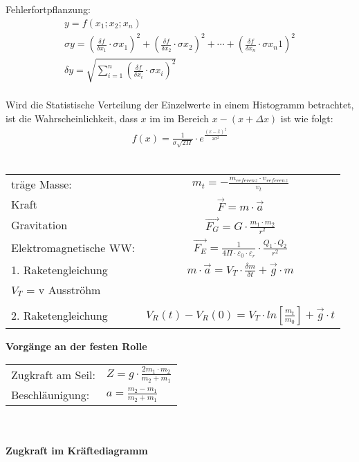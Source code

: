 \documentclass[a4paper,12pt]{scrartcl}
\begin{document}
Fehlerfortpflanzung:
\Large
\begin{multline*}
y = f(x_1;x_2;x_n) \\
\sigma y = (\frac{\delta f}{\delta x_1} \cdot \sigma x_1)^2 + (\frac{\delta f}{\delta x_2} \cdot \sigma x_2)^2 + \dotsb + (\frac{\delta f}{\delta x_n} \cdot \sigma x_n1)^2 \\
\delta y = \sqrt{\sum\limits_{i=1}^n (\frac{\delta f}{\delta x_i} \cdot \sigma x_i)^2}
\end{multline*}
\\
Wird die Statistische Verteilung der Einzelwerte in einem Histogramm betrachtet, ist die Wahrscheinlichkeit, dass $x$ im im Bereich $x-(x+ \Delta x)$ ist wie folgt: \\
\Large
\begin{align*}
 f(x) = \frac{1}{\sigma \sqrt{2 \Pi}} \cdot e^{\frac{(x-\bar{x})^2}{2 \sigma ^2}}
\end{align*}  
\\
\begin{tabular}{lc}


träge Masse: & \Large $m_t = - \frac{m_{referenz} \cdot v_{referenz}}{v_t}$\\


Kraft & $\overrightarrow{F} = m \cdot \overrightarrow{a}$\\
Gravitation & $\overrightarrow{F_G} = G \cdot \frac{m_1 \cdot m_2 }{r^2}$\\
Elektromagnetische WW: & $\overrightarrow{F_E} = \frac{1}{4 \Pi \cdot \varepsilon_0 \cdot \varepsilon_r} \cdot \frac{Q_1 \cdot Q_2}{r^2}$\\

1. Raketengleichung & $m \cdot \overrightarrow{a} = V_T \cdot \frac{\delta m}{\delta t} + \overrightarrow{g} \cdot m$\\
$V_T$ = v Ausströhm\\ & 
\\
2. Raketengleichung & $V_R(t)-V_R(0) = V_T \cdot ln [\frac{m_t}{m_0}]+\overrightarrow{g} \cdot t$\\
\end{tabular}

\newpage
\textbf{Vorgänge an der festen Rolle}\\

\begin{tabular}{ll}
Zugkraft am Seil: & $Z = g \cdot \frac{2 m_1 \cdot m_2}{m_2+m_1}$\\

Beschläunigung: & $a = \frac{m_2-m_1}{m_2+m_1}$\\
\end{tabular}\\
\\
\textbf{Zugkraft im Kräftediagramm}\\
\end{document}

